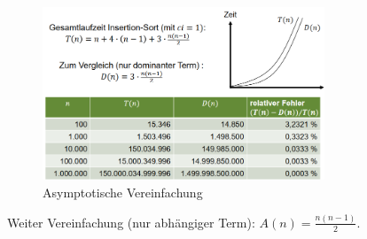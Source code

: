 \documentclass{article}
\begin{document}
            \begin{figure}[ht]
                \centering
                \includegraphics[width=0.75\textwidth]{Bilder/AsVer.png}
                \caption{Asymptotische Vereinfachung}
                \label{fig:AsVer}
            \end{figure}
            \newpage
            Weiter Vereinfachung (nur abhängiger Term): $A(n)=\frac{n(n-1)}{2}$.
\end{document}
